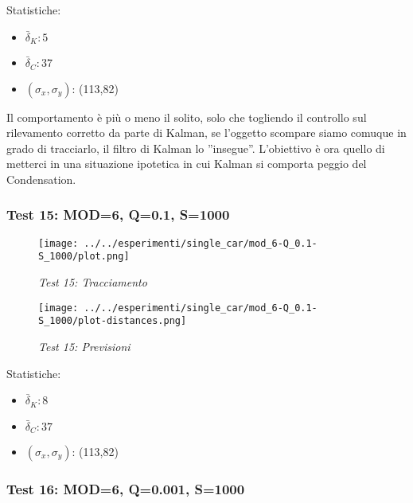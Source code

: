 Statistiche:
\begin{itemize}
\item \begin{math} \bar \delta_K: 5 \end{math}
\item \begin{math} \bar \delta_C: 37 \end{math}
\item \begin{math}(\sigma_x,\sigma_y)\end{math}: (113,82)
\end{itemize}

Il comportamento è più o meno il solito, solo che togliendo il controllo sul rilevamento corretto da parte di Kalman, se l'oggetto scompare siamo comuque in grado di tracciarlo, il filtro di Kalman lo ''insegue''. 
L'obiettivo è ora quello di metterci in una situazione ipotetica in cui Kalman si comporta peggio del Condensation.

\newpage
\subsubsection{Test 15: MOD=6, Q=0.1, S=1000}

\begin{figure}[hb]
\centering
\texttt{[image: ../../esperimenti/single\_car/mod\_6-Q\_0.1-S\_1000/plot.png]}
\caption{\textit{Test 15: Tracciamento}}
\end{figure}

\begin{figure}[hb]
\centering
\texttt{[image: ../../esperimenti/single\_car/mod\_6-Q\_0.1-S\_1000/plot-distances.png]}
\caption{\textit{Test 15: Previsioni}}
\end{figure}

Statistiche:
\begin{itemize}
\item \begin{math} \bar \delta_K: 8 \end{math}
\item \begin{math} \bar \delta_C: 37 \end{math}
\item \begin{math}(\sigma_x,\sigma_y)\end{math}: (113,82)
\end{itemize}

\newpage
\subsubsection{Test 16: MOD=6, Q=0.001, S=1000}

